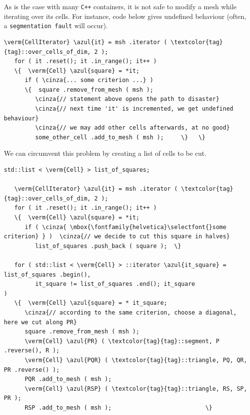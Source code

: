 As is the case with many {\tt C++} containers, it is not safe to modify a mesh while
iterating over its cells.
For instance, code below gives undefined behaviour (often, a {\small\tt segmentation fault}
will occur).

\begin{Verbatim}[commandchars=\\\{\},formatcom=\small\tt,frame=single,
   label=incorrect code !,rulecolor=\color{coment},
   baselinestretch=0.94,framesep=2mm]
   \verm{CellIterator} \azul{it} = msh .iterator ( \textcolor{tag}{tag}::over_cells_of_dim, 2 );
   for ( it .reset(); it .in_range(); it++ )
   \{  \verm{Cell} \azul{square} = *it;
      if ( \cinza{... some criterion ...} )
      \{  square .remove_from_mesh ( msh );
         \cinza{// statement above opens the path to disaster}
         \cinza{// next time 'it' is incremented, we get undefined behaviour}
         \cinza{// we may add other cells afterwards, at no good}
         some_other_cell .add_to_mesh ( msh );     \}   \}
\end{Verbatim}

We can circumvent this problem by creating a list of cells to be cut.

\begin{Verbatim}[commandchars=\\\{\},formatcom=\small\tt,frame=single,
   label=parag-\ref{\numb section 10.\numb parag 3}.cpp,rulecolor=\color{coment},
   baselinestretch=0.94,framesep=2mm]
   std::list < \verm{Cell} > list_of_squares;

   \verm{CellIterator} \azul{it} = msh .iterator ( \textcolor{tag}{tag}::over_cells_of_dim, 2 );
   for ( it .reset(); it .in_range(); it++ )
   \{  \verm{Cell} \azul{square} = *it;
      if ( \cinza{ \mbox{\fontfamily{helvetica}\selectfont{}some criterion} } )  \cinza{// we decide to cut this square in halves}
         list_of_squares .push_back ( square );  \}

   for ( std::list < \verm{Cell} > ::iterator \azul{it_square} = list_of_squares .begin(),
         it_square != list_of_squares .end(); it_square               )
   \{  \verm{Cell} \azul{square} = * it_square;
      \cinza{// according to the same criterion, choose a diagonal, here we cut along PR}
      square .remove_from_mesh ( msh );
      \verm{Cell} \azul{PR} ( \textcolor{tag}{tag}::segment, P .reverse(), R );
      \verm{Cell} \azul{PQR} ( \textcolor{tag}{tag}::triangle, PQ, QR, PR .reverse() );
      PQR .add_to_mesh ( msh );
      \verm{Cell} \azul{RSP} ( \textcolor{tag}{tag}::triangle, RS, SP, PR );
      RSP .add_to_mesh ( msh );                           \}
\end{Verbatim}


